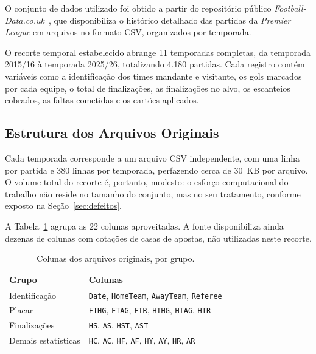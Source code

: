 O conjunto de dados utilizado foi obtido a partir do repositório público
\textit{Football-Data.co.uk}~\cite{FootballData2026}, que disponibiliza o
histórico detalhado das partidas da \textit{Premier League} em arquivos no
formato CSV, organizados por temporada.

O recorte temporal estabelecido abrange 11 temporadas completas, da temporada
2015/16 à temporada 2025/26, totalizando 4.180 partidas. Cada registro contém
variáveis como a identificação dos times mandante e visitante, os gols marcados
por cada equipe, o total de finalizações, as finalizações no alvo, os escanteios
cobrados, as faltas cometidas e os cartões aplicados.

\subsection{Estrutura dos Arquivos Originais}\label{sec:estrutura-bruta}

Cada temporada corresponde a um arquivo CSV independente, com uma linha por
partida e 380 linhas por temporada, perfazendo cerca de 30~KB por arquivo. O
volume total do recorte é, portanto, modesto: o esforço computacional do
trabalho não reside no tamanho do conjunto, mas no seu tratamento, conforme
exposto na Seção~\ref{sec:defeitos}.

A Tabela~\ref{tab:colunas} agrupa as 22 colunas aproveitadas. A fonte
disponibiliza ainda dezenas de colunas com cotações de casas de apostas, não
utilizadas neste recorte.

\begin{table}[htb]
  \centering
  \caption{Colunas dos arquivos originais, por grupo.}
  \label{tab:colunas}
  \small
  \begin{tabular}{@{}lp{9.0cm}@{}}
    \toprule
    \textbf{Grupo} & \textbf{Colunas} \\
    \midrule
    Identificação & \texttt{Date}, \texttt{HomeTeam}, \texttt{AwayTeam},
                    \texttt{Referee} \\
    Placar        & \texttt{FTHG}, \texttt{FTAG}, \texttt{FTR},
                    \texttt{HTHG}, \texttt{HTAG}, \texttt{HTR} \\
    Finalizações  & \texttt{HS}, \texttt{AS}, \texttt{HST}, \texttt{AST} \\
    Demais estatísticas & \texttt{HC}, \texttt{AC}, \texttt{HF}, \texttt{AF},
                          \texttt{HY}, \texttt{AY}, \texttt{HR}, \texttt{AR} \\
    \bottomrule
  \end{tabular}
\end{table}


